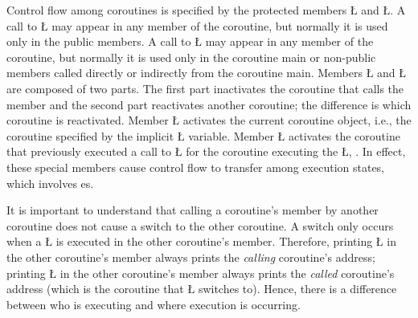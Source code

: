 \documentclass[openright,twoside]{report}
\begin{document}
\enlargethispage{15pt}
Control flow among coroutines is specified by the protected members \LGinlinetrue\LGbegin\lgrinde\L{}\endlgrinde\LGend{} and \LGinlinetrue\LGbegin\lgrinde\L{}\endlgrinde\LGend{}.
A call to \LGinlinetrue\LGbegin\lgrinde\L{}\endlgrinde\LGend{} may appear in any member of the coroutine, but normally it is used only in the public members.
A call to \LGinlinetrue\LGbegin\lgrinde\L{}\endlgrinde\LGend{} may appear in any member of the coroutine, but normally it is used only in the coroutine main or non-public members called directly or indirectly from the coroutine main.
Members \LGinlinetrue\LGbegin\lgrinde\L{}\endlgrinde\LGend{} and \LGinlinetrue\LGbegin\lgrinde\L{}\endlgrinde\LGend{} are composed of two parts.
The first part inactivates the coroutine that calls the member and the second part reactivates another coroutine;
the difference is which coroutine is reactivated.
Member \LGinlinetrue\LGbegin\lgrinde\L{}\endlgrinde\LGend{} activates the current coroutine object, i.e., the coroutine specified by the implicit \LGinlinetrue\LGbegin\lgrinde\L{}\endlgrinde\LGend{} variable.
Member \LGinlinetrue\LGbegin\lgrinde\L{}\endlgrinde\LGend{} activates the coroutine that previously executed a call to \LGinlinetrue\LGbegin\lgrinde\L{}\endlgrinde\LGend{} for the coroutine executing the \LGinlinetrue\LGbegin\lgrinde\L{}\endlgrinde\LGend{}, .
In effect, these special members cause control flow to transfer among execution states, which involves es.

It is important to understand that calling a coroutine's member by another coroutine does not cause a switch to the other coroutine.
A switch only occurs when a \LGinlinetrue\LGbegin\lgrinde\L{}\endlgrinde\LGend{} is executed in the other coroutine's member.
Therefore, printing \LGinlinetrue\LGbegin\lgrinde\L{}\endlgrinde\LGend{} in the other coroutine's member always prints the \emph{calling} coroutine's address;
printing \LGinlinetrue\LGbegin\lgrinde\L{}\endlgrinde\LGend{} in the other coroutine's member always prints the \emph{called} coroutine's address (which is the coroutine that \LGinlinetrue\LGbegin\lgrinde\L{}\endlgrinde\LGend{} switches to).
Hence, there is a difference between who is executing and where execution is occurring.
\end{document}
